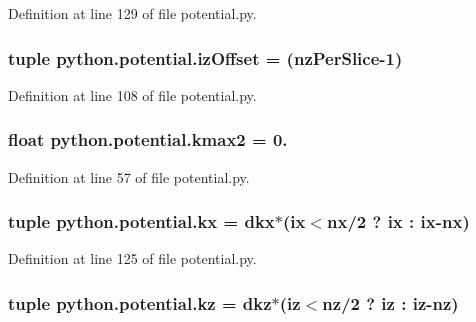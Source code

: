 Definition at line 129 of file potential.\-py.

\hypertarget{namespacepython_1_1potential_a4652c3fcd5721ec0cac806af0fd213c0}{
\subsubsection[{iz\-Offset}]{\setlength{\rightskip}{0pt plus 5cm}tuple python.\-potential.\-iz\-Offset = ({\bf nz\-Per\-Slice}-\/1)}}\label{namespacepython_1_1potential_a4652c3fcd5721ec0cac806af0fd213c0}


Definition at line 108 of file potential.\-py.

\hypertarget{namespacepython_1_1potential_a3d4c72ba4b75f9f8ea75a9055480d271}{
\subsubsection[{kmax2}]{\setlength{\rightskip}{0pt plus 5cm}float python.\-potential.\-kmax2 = 0.}}\label{namespacepython_1_1potential_a3d4c72ba4b75f9f8ea75a9055480d271}


Definition at line 57 of file potential.\-py.

\hypertarget{namespacepython_1_1potential_a31389cfa785790fec1a00869c35b81e6}{
\subsubsection[{kx}]{\setlength{\rightskip}{0pt plus 5cm}tuple python.\-potential.\-kx = {\bf dkx}$\ast$({\bf ix}$<${\bf nx}/2 ? {\bf ix} \-: {\bf ix}-\/{\bf nx})}}\label{namespacepython_1_1potential_a31389cfa785790fec1a00869c35b81e6}


Definition at line 125 of file potential.\-py.

\hypertarget{namespacepython_1_1potential_a3d064aa9e2e35fd2737045ad76d63c1a}{
\subsubsection[{kz}]{\setlength{\rightskip}{0pt plus 5cm}tuple python.\-potential.\-kz = {\bf dkz}$\ast$(iz$<${\bf nz}/2 ? iz \-: iz-\/{\bf nz})}}\label{namespacepython_1_1potential_a3d064aa9e2e35fd2737045ad76d63c1a}


